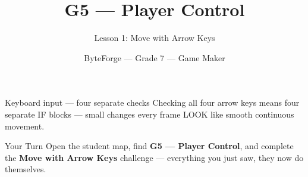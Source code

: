 \documentclass[aspectratio=169]{beamer}
\title{G5 — Player Control}
\subtitle{Lesson 1: Move with Arrow Keys}
\author{ByteForge --- Grade 7 --- Game Maker}
\date{}
\begin{document}
\begin{frame}
    \titlepage
\end{frame}

\begin{frame}{Keyboard input — four separate checks}
    \Large
    Checking all four arrow keys means four separate IF blocks — small changes every frame LOOK like smooth continuous movement.
\end{frame}

\begin{frame}{Your Turn}
    \Large
    Open the student map, find \textbf{G5 — Player Control}, and complete
    the \textbf{Move with Arrow Keys} challenge --- everything you just saw, they now do themselves.
\end{frame}
\end{document}
